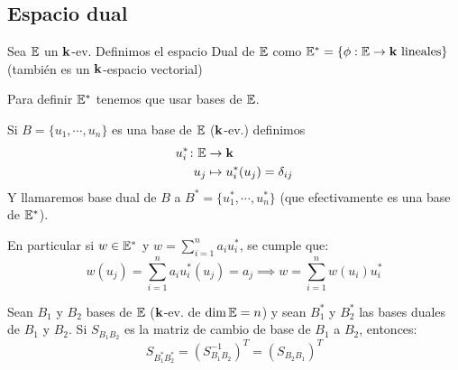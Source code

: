 

\subsection{Espacio dual}

\begin{defi}
	Sea $\mathbb{E}$ un $\mathbf{k}$-ev. Definimos el espacio Dual de $\mathbb{E}$ como
	$\mathbb{E}^* = \{ \phi : \mathbb{E} \to \mathbf{k} \text{ lineales} \}$ (también es un
	$\mathbf{k}$-espacio vectorial)
\end{defi}
\begin{obs}
	Para definir $\mathbb{E}^*$ tenemos que usar bases de $\mathbb{E}$.
\end{obs}
\begin{defi}
	Si $B = \{ u_1,\cdots, u_n \}$ es una base de $\mathbb{E}$ ($\mathbf{k}$-ev.)
	definimos
	\[
		\begin{aligned}
			u_i^* \colon \mathbb{E} &\to \mathbf{k}\\
			u_j &\mapsto u_i^*(u_j) = \delta_{ij}
		\end{aligned}
	\]
	Y llamaremos base dual de $B$ a
	$B^* = \{ u_1^*, \cdots, u_n^* \}$ (que efectivamente es una
	base de $\mathbb{E}^*$).
\end{defi}
\begin{obs}
	En particular si $w \in \mathbb{E}^*$ y
	$\displaystyle w = \sum_{i=1}^{n} a_i u_i^*$, se cumple que:
	\[
		w(u_j) = \sum_{i=1}^{n} a_i u_i^*(u_j) = a_j
		\implies
		w = \sum_{i=1}^{n}w(u_i)u_i^*
	\]
\end{obs}

\begin{prop}
	Sean $B_1$ y $B_2$ bases de $\mathbb{E}$ ($\mathbf{k}$-ev. de $\dim  \mathbb{E} = n$) y
	sean $B_1^*$ y $B_2^*$ las bases duales de $B_1$ y $B_2$.
	Si $S_{B_1B_2}$ es la matriz de cambio de base de $B_1$ a
	$B_2$, entonces:
	\[
		S_{B_1^*B_2^*} = (S_{B_1B_2}^{-1})^T = (S_{B_2B_1})^T
	\]
\end{prop}

